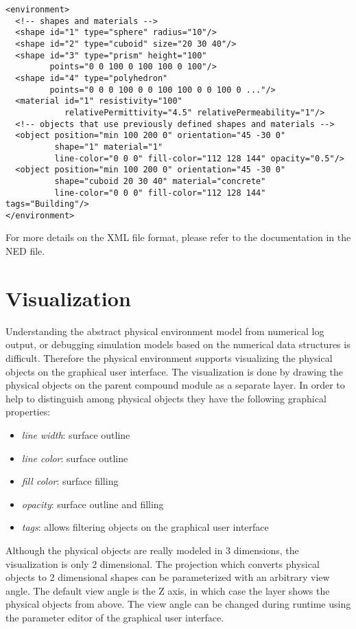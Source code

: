 \begin{verbatim}
<environment>
  <!-- shapes and materials -->
  <shape id="1" type="sphere" radius="10"/>
  <shape id="2" type="cuboid" size="20 30 40"/>
  <shape id="3" type="prism" height="100"
         points="0 0 100 0 100 100 0 100"/>
  <shape id="4" type="polyhedron"
         points="0 0 0 100 0 0 100 100 0 0 100 0 ..."/>
  <material id="1" resistivity="100"
            relativePermittivity="4.5" relativePermeability="1"/>
  <!-- objects that use previously defined shapes and materials -->
  <object position="min 100 200 0" orientation="45 -30 0"
          shape="1" material="1"
          line-color="0 0 0" fill-color="112 128 144" opacity="0.5"/>
  <object position="min 100 200 0" orientation="45 -30 0"
          shape="cuboid 20 30 40" material="concrete"
          line-color="0 0 0" fill-color="112 128 144" tags="Building"/>
</environment>
\end{verbatim}

For more details on the XML file format, please refer to the documentation in the
 NED file.

\section{Visualization}

Understanding the abstract physical environment model from numerical log output,
or debugging simulation models based on the numerical data structures is
difficult. Therefore the physical environment supports visualizing the physical
objects on the graphical user interface. The visualization is done by drawing
the physical objects on the parent compound module as a separate layer. In order
to help to distinguish among physical objects they have the following graphical
properties:

\begin{itemize}
  \item \textit{line width}: surface outline
  \item \textit{line color}: surface outline
  \item \textit{fill color}: surface filling
  \item \textit{opacity}: surface outline and filling
  \item \textit{tags}: allows filtering objects on the graphical user interface
\end{itemize}

Although the physical objects are really modeled in 3 dimensions, the
visualization is only 2 dimensional. The projection which converts physical
objects to 2 dimensional shapes can be parameterized with an arbitrary view
angle. The default view angle is the Z axis, in which case the layer shows the
physical objects from above. The view angle can be changed during runtime using
the parameter editor of the graphical user interface.

